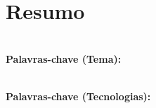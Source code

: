 \titleformat{\chapter}[display]
  {\normalfont\bfseries}{}{0pt}{\Huge}

\chapter*{Resumo}

\textbf{\\Palavras-chave (Tema): } 

\textbf{\\Palavras-chave (Tecnologias):}

 